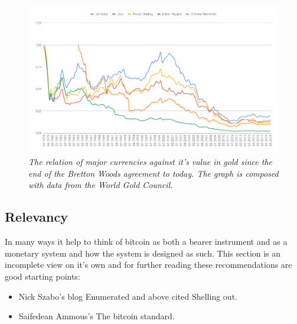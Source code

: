 \newpage
\onecolumn
\begin{figure}[!htb]
	\centering
	\includegraphics[width=16cm]{gold-price.png}
	\caption{\textit{The relation of major currencies against it's value in gold since the end of the Bretton Woods agreement to
			today. The graph is composed with data from the World Gold Council\cite{world:gold:council}. 
	}}
	\label{fig:seb:promissory:note}
\end{figure}
\twocolumn


\subsection{Relevancy}
In many ways it help to think of bitcoin
as both a bearer instrument and as a monetary system and how the 
system is designed as such. This
section is an incomplete view on it's own and for
further reading these recommendations are good starting points: 

\begin{itemize}
	\item Nick Szabo's blog Enumerated and above cited Shelling out\cite{szabo:shelling:out}.
	\item Saifedean Ammous's The bitcoin standard.\cite{ammous:bitcoin:standard}
\end{itemize}


